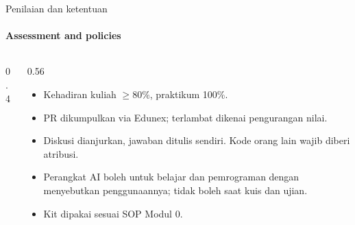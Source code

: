 \documentclass[aspectratio=169,10pt]{beamer}
\begin{document}
\begin{frame}{Penilaian dan ketentuan}
	\framesubtitle{Assessment and policies}
	\begin{columns}[T]
		\begin{column}{0.4\textwidth}
		\end{column}
		\begin{column}{0.56\textwidth}
			\small
			\begin{itemize}
				\item Kehadiran kuliah $\geq 80\%$, praktikum 100\%.\\ 
				\item PR dikumpulkan via Edunex; terlambat dikenai pengurangan nilai.
				\item Diskusi dianjurkan, jawaban ditulis sendiri. Kode orang lain wajib diberi atribusi.
				\item Perangkat AI boleh untuk belajar dan pemrograman dengan menyebutkan penggunaannya; \alert{tidak boleh} saat kuis dan ujian.
				\item Kit dipakai sesuai SOP Modul 0.
			\end{itemize}
		\end{column}
	\end{columns}
\end{frame}
\end{document}
